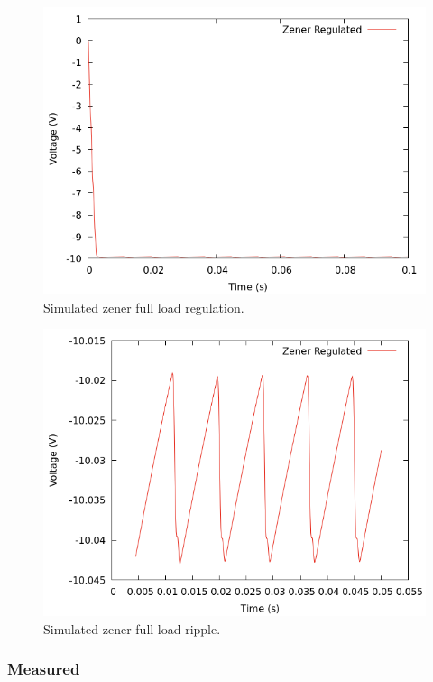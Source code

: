 \documentclass[12pt]{article}
\newcommand{\graphwidth}{0.5\linewidth}
\begin{document}
\begin{appendix}
\begin{figure}[H]
    \centering
    \includegraphics[width=\graphwidth]{./res/image/sim-neg-regulated-load.png}
    \caption{Simulated zener full load regulation.}
    \label{sim:neg_load}
\end{figure}

\begin{figure}[H]
    \centering
    \includegraphics[width=\graphwidth]{./res/image/sim-neg-regulated-noload-ripple.png}
    \caption{Simulated zener full load ripple.}
    \label{neg:neg_noload_ripple}
\end{figure}

\subsubsection{Measured}


\end{appendix}
\end{document}
